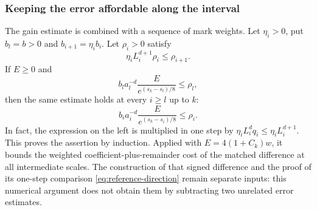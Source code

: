 \subsubsection{Keeping the error affordable along the interval}
The gain estimate is combined with a sequence of mark
weights. Let $\eta_i>0$, put $b_l=b>0$ and
$b_{i+1}=\eta_i b_i$. Let $\rho_i>0$ satisfy
\[
                         \eta_iL_i^{d+1}\rho_i\le\rho_{i+1}.
\]
If $E\ge0$ and
\[
                 b_la_l^{-d}\frac{E}{e^{(s_k-s_l)/8}}
                                      \le\rho_l,
\]
then the same estimate holds at every $i\ge l$ up to $k$:
\begin{equation}\label{eq:reference-affordable}
                 b_ia_i^{-d}\frac{E}{e^{(s_k-s_i)/8}}
                                      \le\rho_i.
\end{equation}
In fact, the expression on the left is multiplied in one step
by $\eta_iL_i^d q_i\le\eta_iL_i^{d+1}$. This proves the assertion
by induction. Applied with $E=4(1+C_k)w$, it bounds the weighted
coefficient-plus-remainder cost of the matched difference at all
intermediate scales. The construction of that signed difference
and the proof of its one-step comparison
\eqref{eq:reference-direction} remain separate inputs: this
numerical argument does not obtain them by subtracting two
unrelated error estimates.
